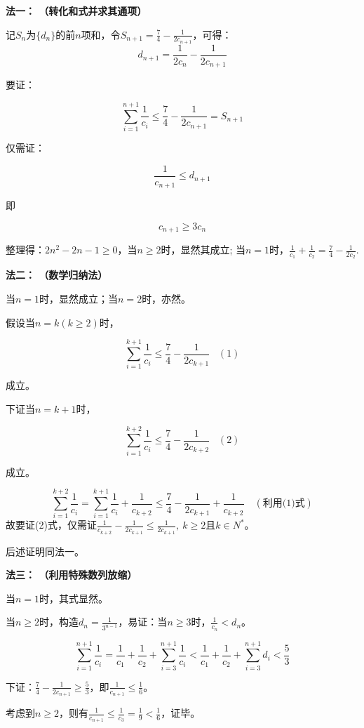 \documentclass{article}
\begin{document}
\noindent \textbf{法一： （转化和式并求其通项）}

记$S_n$为$\{d_n\}$的前$n$项和，令$S_{n+1}=\frac{7}{4}-\frac{1}{2c_{n+1}}$，可得：
\[
d_{n+1}=\frac{1}{2c_n}-\frac{1}{2c_{n+1}}
\]

要证：

$$\sum_{i=1}^{n+1}\frac{1}{c_i}\le \frac{7}{4}-\frac{1}{2c_{n+1}}=S_{n+1}$$

仅需证：

$$\frac{1}{c_{n+1}}\le d_{n+1}$$

即

$$c_{n+1}\ge 3c_n$$

整理得：$2n^2-2n-1\ge 0$，当$n\ge 2$时，显然其成立;
当$n=1$时，$\frac{1}{c_1}+\frac{1}{c_2}=\frac{7}{4}-\frac{1}{2c_2}$.
\vspace{2\baselineskip}

\noindent \textbf{法二： （数学归纳法）}

当$n=1$时，显然成立；当$n=2$时，亦然。

假设当$n=k(k\ge 2)$时，

$$\sum_{i=1}^{k+1}\frac{1}{c_i}\le \frac{7}{4}-\frac{1}{2c_{k+1}}  \;\;\;(1)$$ 

成立。

下证当$n=k+1$时，

$$\sum_{i=1}^{k+2}\frac{1}{c_i}\le \frac{7}{4}-\frac{1}{2c_{k+2}} \;\;\;(2)$$

成立。

\[
\sum_{i=1}^{k+2}\frac{1}{c_i}=\sum_{i=1}^{k+1}\frac{1}{c_i}+\frac{1}{c_{k+2}}\le \frac{7}{4}-\frac{1}{2c_{k+1}}+\frac{1}{c_{k+2}} \quad (\text{利用(1)式})
\]
故要证(2)式，仅需证$\frac{1}{c_{k+2}}-\frac{1}{2c_{k+1}}\le \frac{1}{2c_{k+1}},\ k\ge 2$且$k\in N^*$。

后述证明同法一。
\vspace{2\baselineskip}

\noindent \textbf{法三： （利用特殊数列放缩）}

当$n=1$时，其式显然。

当$n\ge 2$时，构造$d_n=\frac{1}{3^{n-1}}$，易证：当$n\ge 3$时，$\frac{1}{c_n}<d_n$。

\[
\sum_{i=1}^{n+1}\frac{1}{c_i}=\frac{1}{c_1}+\frac{1}{c_2}+\sum_{i=3}^{n+1}\frac{1}{c_i}<\frac{1}{c_1}+\frac{1}{c_2}+\sum_{i=3}^{n+1}d_i<\frac{5}{3}
\]

下证：$\frac{7}{4}-\frac{1}{2c_{n+1}}\ge \frac{5}{3}$，即$\frac{1}{c_{n+1}}\le \frac{1}{6}$。

考虑到$n\ge 2$，则有$\frac{1}{c_{n+1}}\le \frac{1}{c_3}=\frac{1}{9}<\frac{1}{6}$，证毕。
\vspace{3\baselineskip}
\end{document}
